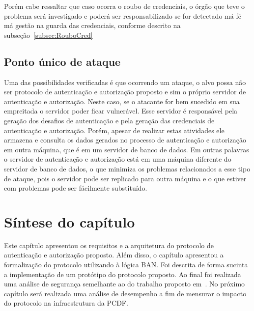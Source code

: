 Porém cabe ressaltar que caso ocorra o roubo de credenciais, o órgão que teve o problema será investigado e poderá ser responsabilizado se for detectado má fé má gestão na guarda das credenciais, conforme descrito na subseção~\ref{subsec:RouboCred}


\subsection{Ponto único de ataque}

Uma das possibilidades verificadas é que ocorrendo um ataque, o alvo possa não ser protocolo de autenticação e autorização proposto e sim o próprio servidor de autenticação e autorização. Neste caso, se o atacante for bem sucedido em sua empreitada o servidor poder ficar vulnerável. Esse servidor é responsável pela geração dos desafios de autenticação e pela geração das credenciais de autenticação e autorização. Porém, apesar de realizar estas atividades ele armazena e consulta os dados gerados no processo de autenticação e autorização em outra máquina, que é em um servidor de banco de dados. Em outras palavras o servidor de autenticação e autorização está em uma máquina diferente do servidor de banco de dados, o que minimiza os problemas relacionados a esse tipo de ataque, pois o servidor pode ser replicado para outra máquina e o que estiver com problemas pode ser fácilmente substituído.
\section{Síntese do capítulo}

Este capítulo apresentou os requisitos e a arquitetura do protocolo de autenticação e autorização proposto.  Além disso,  o capítulo apresentou a formalização do protocolo utilizando à lógica BAN.  Foi descrita de forma sucinta a implementação de um protótipo do protocolo proposto. Ao final foi realizada uma análise de segurança semelhante ao do trabalho proposto em~\cite{traust08}. No próximo capítulo será realizada uma análise de desempenho a fim de mensurar o impacto do protocolo na infraestrutura da PCDF. 